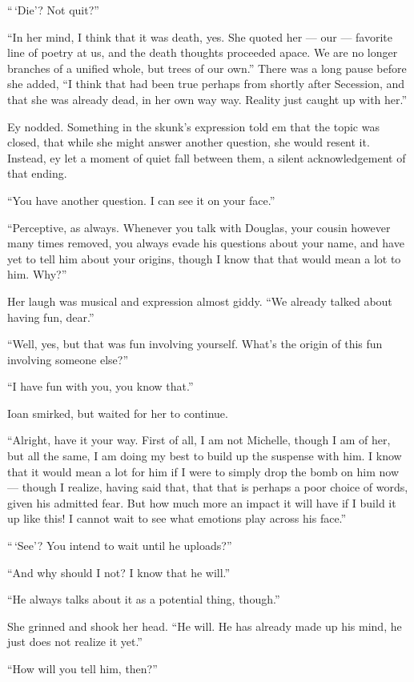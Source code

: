 ``\,`Die'? Not quit?''

``In her mind, I think that it was death, yes. She quoted her — our — favorite line of poetry at us, and the death thoughts proceeded apace. We are no longer branches of a unified whole, but trees of our own.'' There was a long pause before she added, ``I think that had been true perhaps from shortly after Secession, and that she was already dead, in her own way way. Reality just caught up with her.''

Ey nodded. Something in the skunk's expression told em that the topic was closed, that while she might answer another question, she would resent it. Instead, ey let a moment of quiet fall between them, a silent acknowledgement of that ending.

``You have another question. I can see it on your face.''

``Perceptive, as always. Whenever you talk with Douglas, your cousin however many times removed, you always evade his questions about your name, and have yet to tell him about your origins, though I know that that would mean a lot to him. Why?''

Her laugh was musical and expression almost giddy. ``We already talked about having fun, dear.''

``Well, yes, but that was fun involving yourself. What's the origin of this fun involving someone else?''

``I have fun with you, you know that.''

Ioan smirked, but waited for her to continue.

``Alright, have it your way. First of all, I am not Michelle, though I am of her, but all the same, I am doing my best to build up the suspense with him. I know that it would mean a lot for him if I were to simply drop the bomb on him now — though I realize, having said that, that that is perhaps a poor choice of words, given his admitted fear. But how much more an impact it will have if I build it up like this! I cannot wait to see what emotions play across his face.''

``\,`See'? You intend to wait until he uploads?''

``And why should I not? I know that he will.''

``He always talks about it as a potential thing, though.''

She grinned and shook her head. ``He will. He has already made up his mind, he just does not realize it yet.''

``How will you tell him, then?''

